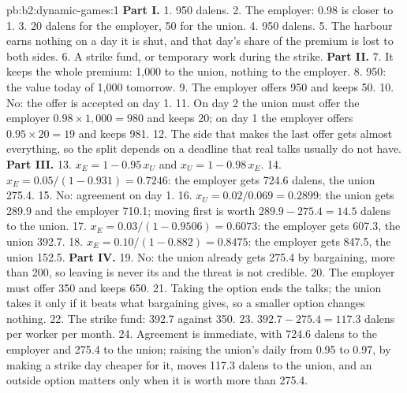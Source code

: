 \begin{solution}{pb:b2:dynamic-games:1}
\textbf{Part I.}
1. 950 dalens.
2. The employer: 0.98 is closer to 1.
3. 20 dalens for the employer, 50 for the union.
4. 950 dalens.
5. The harbour earns nothing on a day it is shut, and that day's share of the premium is lost to both sides.
6. A strike fund, or temporary work during the strike.
\textbf{Part II.}
7. It keeps the whole premium: 1{,}000 to the union, nothing to the employer.
8. 950: the value today of 1{,}000 tomorrow.
9. The employer offers 950 and keeps 50.
10. No: the offer is accepted on day 1.
11. On day 2 the union must offer the employer $0.98 \times 1{,}000 = 980$ and keeps 20; on day 1 the employer offers $0.95
\times 20 = 19$ and keeps 981.
12. The side that makes the last offer gets almost everything, so the split depends on a deadline that real
talks usually do not have.
\textbf{Part III.}
13. $x_E = 1 - 0.95\,x_U$ and $x_U = 1 - 0.98\,x_E$.
14. $x_E = 0.05/(1 - 0.931) = 0.7246$: the employer gets 724.6 dalens, the union 275.4.
15. No: agreement on day 1.
16. $x_U = 0.02/0.069 = 0.2899$: the union gets 289.9 and the employer 710.1; moving first is worth $289.9 - 275.4 = 14.5$
dalens to the union.
17. $x_E = 0.03/(1 - 0.9506) = 0.6073$: the employer gets 607.3, the union 392.7.
18. $x_E = 0.10/(1 - 0.882) = 0.8475$: the employer gets 847.5, the union 152.5.
\textbf{Part IV.}
19. No: the union already gets 275.4 by bargaining, more than 200, so leaving is never its  and the
threat is not credible.
20. The employer must offer 350 and keeps 650.
21. Taking the option ends the talks; the union takes it only if it beats what bargaining gives, so a smaller
option changes nothing.
22. The strike fund: 392.7 against 350.
23. $392.7 - 275.4 = 117.3$ dalens per worker per month.
24. Agreement is immediate, with 724.6 dalens to the employer and 275.4 to the union; raising the union's daily
 from 0.95 to 0.97, by making a strike day cheaper for it, moves 117.3 dalens to the union, and an
outside option matters only when it is worth more than 275.4.
\end{solution}
